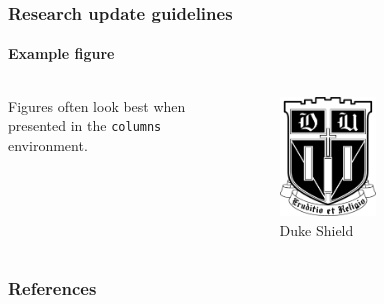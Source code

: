 \documentclass[aspectratio=1610]{beamer}
\begin{document}
\begin{frame}
  \frametitle{Research update guidelines}
  \framesubtitle{Example figure}
  \begin{columns}
    \begin{column}{0.5\textwidth}
      Figures often look best when presented in the \texttt{columns} environment.
    \end{column}
    \begin{column}{0.5\textwidth}
      \begin{figure}
        \centering
        \includegraphics[width=0.5\textwidth]{images/dukeshield.pdf}
        \caption{Duke Shield}
      \end{figure}
    \end{column}
  \end{columns}
\end{frame}

\begin{frame}[t,allowframebreaks]
  \frametitle{References}
  \printbibliography
\end{frame}
\end{document}
